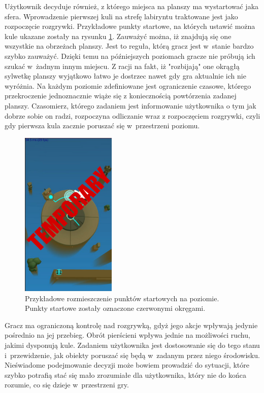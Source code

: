 \documentclass[a4paper,12pt,numbers=noenddot]{report}
\begin{document}
Użytkownik decyduje również, z którego miejsca na planszy ma wystartować jaka sfera. Wprowadzenie pierwszej kuli na strefę labiryntu traktowane jest jako rozpoczęcie rozgrywki. Przykładowe punkty startowe, na których ustawić można kule ukazane zostały na rysunku \ref{fig:sphaze_startpoints_1}. Zauważyć można, iż znajdują się one wszystkie na obrzeżach planszy. Jest to reguła, którą gracz jest w~stanie bardzo szybko zauważyć. Dzięki temu na późniejszych poziomach gracze nie próbują ich szukać w~żadnym innym miejscu. Z racji na fakt, iż "rozbijają" one okrągłą sylwetkę planszy wyjątkowo łatwo je dostrzec nawet gdy gra aktualnie ich nie wyróżnia. 
Na każdym poziomie zdefiniowane jest ograniczenie czasowe, którego przekroczenie jednoznacznie wiąże się z koniecznością powtórzenia zadanej planszy. Czasomierz, którego zadaniem jest informowanie użytkownika o tym jak dobrze sobie on radzi, rozpoczyna odliczanie wraz z rozpoczęciem rozgrywki, czyli gdy pierwsza kula zacznie poruszać się w~przestrzeni poziomu. 

\begin{figure}[h!]
	\centering
  	\includegraphics[height=8cm]{fig/tmp.jpg}
	\caption{Przykładowe rozmieszczenie punktów startowych na poziomie. Punkty startowe zostały oznaczone czerwonymi okręgami.}
	\label{fig:sphaze_startpoints_1}
\end{figure}

Gracz ma ograniczoną kontrolę nad rozgrywką, gdyż jego akcje wpływają jedynie pośrednio na jej przebieg. Obrót pierścieni wpływa jednie na możliwości ruchu, jakimi dysponują kule. Zadaniem użytkownika jest dostosowanie się do tego stanu i~przewidzenie, jak obiekty poruszać się będą w~zadanym przez niego środowisku. Nieświadome podejmowanie decyzji może bowiem prowadzić do sytuacji, które szybko potrafią stać się mało zrozumiałe dla użytkownika, który nie do końca rozumie, co się dzieje w~przestrzeni gry.
\end{document}
